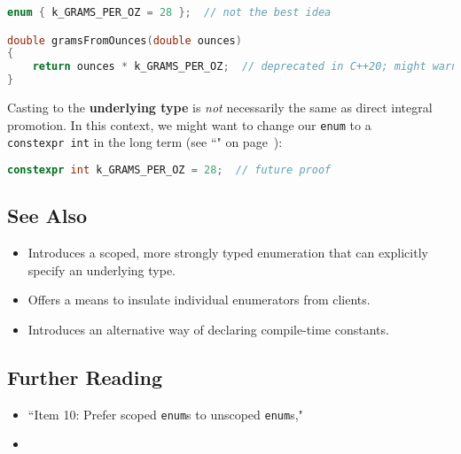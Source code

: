 \begin{lstlisting}[language=C++]
enum { k_GRAMS_PER_OZ = 28 };  // not the best idea

double gramsFromOunces(double ounces)
{
    return ounces * k_GRAMS_PER_OZ;  // deprecated in C++20; might warn
}
\end{lstlisting}

\noindent Casting to the \textbf{underlying type} is \emph{not} necessarily the
same as direct integral promotion. In this context, we might want to
change our \texttt{enum} to a
\texttt{constexpr}~\texttt{int} in the long
term (see
  ``" on page~\pageref{constexprvar}):

\begin{lstlisting}[language=C++]
constexpr int k_GRAMS_PER_OZ = 28;  // future proof
\end{lstlisting}


\subsection[See Also]{See Also}\label{see-also}

\begin{itemize}
\item{Introduces a scoped, more strongly typed enumeration that can explicitly specify an underlying type.}
\item{Offers a means to insulate individual enumerators from clients.}
\item{Introduces an alternative way of declaring compile-time constants.}
\end{itemize}

\subsection[Further Reading]{Further Reading}\label{further-reading}

\begin{itemize}
\item{``Item 10: Prefer scoped \texttt{enum}s to unscoped \texttt{enum}s," \cite{meyers15}}
\item{\cite{grimm17}}
\end{itemize}

